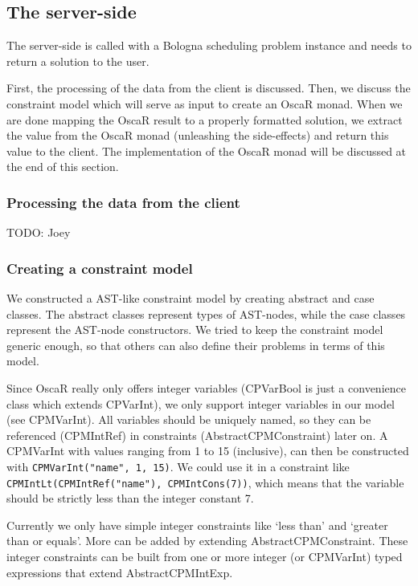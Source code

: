 \documentclass[a4paper]{article}
\begin{document}
\subsection{The server-side}
The server-side is called with a Bologna scheduling problem instance
and needs to return a solution to the user.

First, the processing of the data from the client is discussed.
Then, we discuss the constraint model which will serve as input to create
an OscaR monad.
When we are done mapping the OscaR result to a properly formatted solution,
we extract the value from the OscaR monad (unleashing the side-effects)
and return this value to the client.
The implementation of the OscaR monad will be discussed at the end of this section.
\subsubsection{Processing the data from the client}
{\Large TODO:} Joey



\subsubsection{Creating a constraint model}
We constructed a AST-like constraint model by creating 
abstract and case classes. 
The abstract classes represent types of AST-nodes, 
while the case classes represent the AST-node constructors.
We tried to keep the constraint model generic enough,
so that others can also define their problems in terms of this model.

Since OscaR really only offers integer variables 
(CPVarBool is just a convenience class which extends CPVarInt),
we only support integer variables in our model (see CPMVarInt).
All variables should be uniquely named, 
so they can be referenced (CPMIntRef) in constraints (AbstractCPMConstraint) later on.
A CPMVarInt with values ranging from 1 to 15 (inclusive), 
can then be constructed with \verb|CPMVarInt("name", 1, 15)|.
We could use it in a constraint like 
\verb|CPMIntLt(CPMIntRef("name"), CPMIntCons(7))|,
which means that the variable should be strictly less than the integer constant 7.

Currently we only have simple integer constraints
like `less than' and `greater than or equals'.
More can be added by extending AbstractCPMConstraint.
These integer constraints can be built from one or more integer 
(or CPMVarInt) typed expressions that extend AbstractCPMIntExp.
\end{document}
